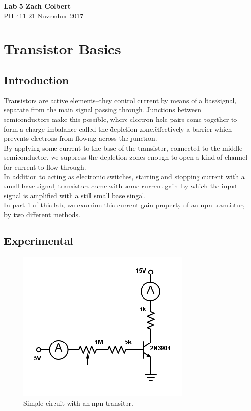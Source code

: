\documentclass[11pt]{article}
\begin{document}
\noindent
\large\textbf{Lab 5} \hfill \textbf{Zach Colbert} \\
\normalsize PH 411 \hfill 21 November 2017\\

\section{Transistor Basics}
\subsection{Introduction}

Transistors are active elements--they control current by means of a \"base\" signal, separate from the main signal passing through. Junctions between semiconductors make this possible, where electron-hole pairs come together to form a charge imbalance called the \"depletion zone,\" effectively a barrier which prevents electrons from flowing across the junction.\\

By applying some current to the base of the transistor, connected to the middle semiconductor, we suppress the depletion zones enough to open a kind of channel for current to flow through.\\

In addition to acting as electronic switches, starting and stopping current with a small base signal, transistors come with some current gain--by which the input signal is amplified with a still small base singal.\\

In part 1 of this lab, we examine this current gain property of an npn transistor, by two different methods.\\

\subsection{Experimental}

\begin{figure}[H]
    \centering
    \includegraphics[scale=0.4]{Diagrams/c-1c.png}
    \caption{Simple circuit with an npn transitor.}
    \label{circuit:1c}
\end{figure} 
\end{document}
